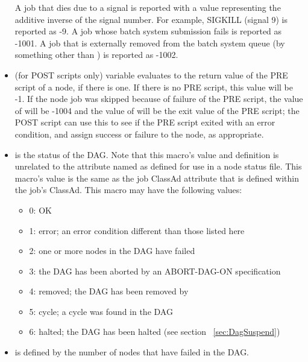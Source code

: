 \begin{itemize}
A job that dies due to a signal is reported with a  value
representing the additive inverse of the signal number.
For example, SIGKILL (signal 9) is reported as -9.
A job whose batch system submission fails is reported as -1001.
A job that is externally removed from the batch system queue
(by something other than ) is reported as -1002.

\item {}
 (for POST scripts only)
variable evaluates to the return value of the PRE script of a node, 
if there is one.
If there is no PRE script, this value will be -1.
If the node job was skipped because of failure of the PRE script,
the value of  will be -1004
and the value of  will be the exit value
of the PRE script;
the POST script can use this to see if the PRE script exited
with an error condition, and assign success or failure to the node, as
appropriate.

\item {} is the status of the DAG.
Note that this macro's value and definition is unrelated to the attribute 
named  as defined for use in a node status file.
This macro's value is the same as the job ClassAd attribute 
that is defined within the  job's ClassAd.
This macro may have the following values:
\begin{itemize}
\item 0: OK
\item 1: error; an error condition different than those listed here
\item 2: one or more nodes in the DAG have failed
\item 3: the DAG has been aborted by an ABORT-DAG-ON specification
\item 4: removed; the DAG has been removed by 
\item 5: cycle; a cycle was found in the DAG
\item 6: halted; the DAG has been halted (see section ~\ref{sec:DagSuspend})
\end{itemize}

\item {} is defined by the number of nodes that have failed in the
DAG.

\end{itemize}


